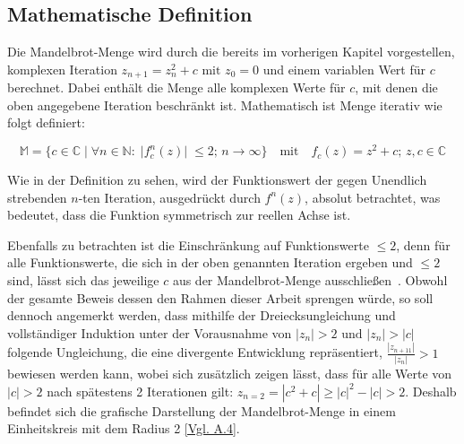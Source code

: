 \subsection{Mathematische Definition}\label{subsec:mathematical-definition}

Die Mandelbrot-Menge wird durch die bereits im vorherigen Kapitel vorgestellen,
komplexen Iteration \(z_{n+1} = z_n^2 + c \text{ mit } z_0 = 0\) und einem variablen
Wert für \(c\)~\cite*[S.25]{schuh_fraktale_2017} berechnet.
Dabei enthält die Menge alle komplexen Werte für $c$, mit denen die
oben angegebene Iteration beschränkt ist.
Mathematisch ist Menge iterativ wie folgt definiert:

\begin{equation}\label{eq:mathematical-definition}
  \mathbb{M} = \{c \in \mathbb{C} \; |\;  \forall n \in \mathbb{N}:\; |f_c^n(z)|\; \leqslant 2;\, n \to \infty\}
  \quad
  \text{mit}
  \quad
  f_c(z) = z^2 + c;\, z,c \in \mathbb{C}
\end{equation}

Wie in der Definition zu sehen, wird der Funktionswert der
gegen Unendlich strebenden $n$-ten Iteration, ausgedrückt durch $f^n(z)$,
absolut betrachtet, was bedeutet, dass die Funktion symmetrisch zur reellen Achse ist.

Ebenfalls zu betrachten ist die Einschränkung auf Funktionswerte $\leqslant 2$, denn
für alle Funktionswerte, die sich in der oben genannten Iteration ergeben
und $\leqslant 2$ sind, lässt sich das jeweilige $c$ aus der Mandelbrot-Menge
ausschließen~\cite{munafo_escape_1997}.
Obwohl der gesamte Beweis dessen den Rahmen dieser Arbeit sprengen würde,
so soll dennoch angemerkt werden, dass mithilfe der Dreiecksungleichung und
vollständiger Induktion unter der Vorausnahme von $|z_n| > 2 \text{ und } |z_n| > |c|$
folgende Ungleichung, die eine divergente Entwicklung repräsentiert,
$\frac{|z_{n+11}|}{|z_n|} > 1$ bewiesen werden kann, wobei sich zusätzlich zeigen
lässt, dass für alle Werte von $|c| > 2$ nach spätestens 2 Iterationen gilt:
$z_{n=2} = |c^2 + c| \geqslant |c|^2 - |c| > 2$.
Deshalb befindet sich die grafische Darstellung der Mandelbrot-Menge in einem
Einheitskreis mit dem Radius 2 \hyperref[app:4]{[Vgl. A.4]}.